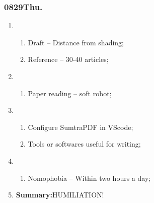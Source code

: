\subsubsection{0829Thu.}
\begin{enumerate}
	\item \ncquaone
	\begin{enumerate}[(1)]
		\item Draft -- Distance from shading;\rightundoneBlack
		\item Reference -- 30-40 articles;\rightundoneBlack
	\end{enumerate}
	
	\item \ncquatwo	
	\begin{enumerate}[(1)]
		\item Paper reading -- soft robot;\rightundoneBlack
	\end{enumerate}
	
	\item \ncquathree
	\begin{enumerate}[(1)]
		\item Configure SumtraPDF in VScode;\rightdone
		\item Tools or softwares useful for writing;\rightdone 
	\end{enumerate}
	
	\item \ncquafour	
	\begin{enumerate}[(1)]
		\item Nomophobia -- Within two hours a day;\rightundoneBlack
	\end{enumerate}
	\item \textbf{Summary:}HUMILIATION! 
\end{enumerate}

